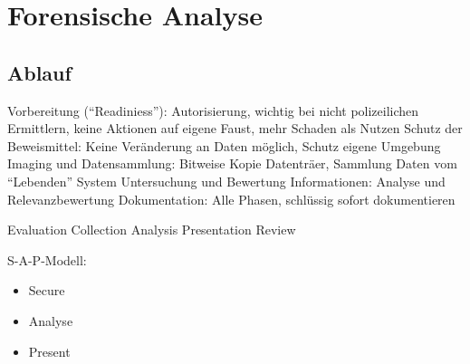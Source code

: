 \chapter{Forensische Analyse}
\section{Ablauf}
Vorbereitung ("`Readiniess"'): Autorisierung, wichtig bei nicht polizeilichen Ermittlern, keine Aktionen auf eigene Faust, mehr Schaden als Nutzen
Schutz der Beweismittel: Keine Veränderung an Daten möglich, Schutz eigene Umgebung
Imaging und Datensammlung: Bitweise Kopie Datenträer, Sammlung Daten vom "`Lebenden"' System
Untersuchung und Bewertung Informationen: Analyse und Relevanzbewertung
Dokumentation: Alle Phasen, schlüssig sofort dokumentieren

Evaluation 
Collection
Analysis
Presentation
Review

S-A-P-Modell:
\begin{itemize}
\item Secure
\item Analyse
\item Present
\end{itemize}

